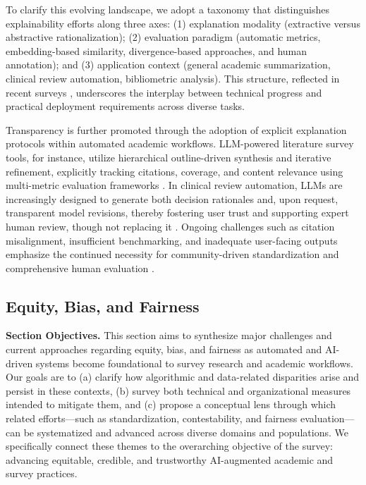\documentclass[sigconf]{acmart}
\begin{document}
To clarify this evolving landscape, we adopt a taxonomy that distinguishes explainability efforts along three axes: (1) explanation modality (extractive versus abstractive rationalization); (2) evaluation paradigm (automatic metrics, embedding-based similarity, divergence-based approaches, and human annotation); and (3) application context (general academic summarization, clinical review automation, bibliometric analysis). This structure, reflected in recent surveys \cite{ref46,ref47,ref80}, underscores the interplay between technical progress and practical deployment requirements across diverse tasks.

Transparency is further promoted through the adoption of explicit explanation protocols within automated academic workflows. LLM-powered literature survey tools, for instance, utilize hierarchical outline-driven synthesis and iterative refinement, explicitly tracking citations, coverage, and content relevance using multi-metric evaluation frameworks \cite{ref62,ref80,ref82,ref102}. In clinical review automation, LLMs are increasingly designed to generate both decision rationales and, upon request, transparent model revisions, thereby fostering user trust and supporting expert human review, though not replacing it \cite{ref80,ref102,ref103}. Ongoing challenges such as citation misalignment, insufficient benchmarking, and inadequate user-facing outputs emphasize the continued necessity for community-driven standardization and comprehensive human evaluation \cite{ref39,ref62,ref64,ref80,ref83,ref106}.

\subsection{Equity, Bias, and Fairness}

\textbf{Section Objectives.} This section aims to synthesize major challenges and current approaches regarding equity, bias, and fairness as automated and AI-driven systems become foundational to survey research and academic workflows. Our goals are to (a) clarify how algorithmic and data-related disparities arise and persist in these contexts, (b) survey both technical and organizational measures intended to mitigate them, and (c) propose a conceptual lens through which related efforts—such as standardization, contestability, and fairness evaluation—can be systematized and advanced across diverse domains and populations. We specifically connect these themes to the overarching objective of the survey: advancing equitable, credible, and trustworthy AI-augmented academic and survey practices.
\end{document}

